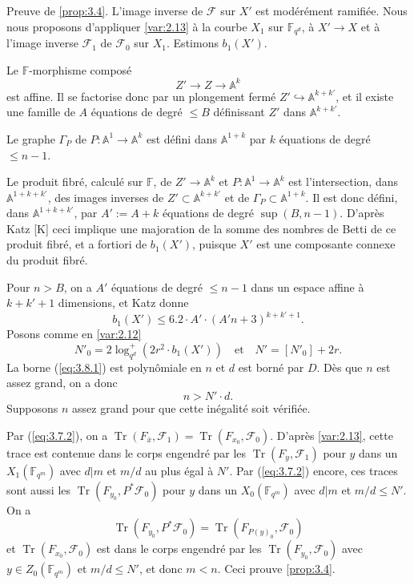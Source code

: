 \documentclass[11pt,a4paper]{article}
\theoremstyle{plain}
\theoremstyle{definition}
\DeclareMathOperator{\tr}{Tr}
\begin{document}
Preuve de \ref{prop:3.4}. L'image inverse de $\mathcal{F}$ sur $X'$ est mod\'er\'ement ramifi\'ee. Nous nous proposons d'appliquer \ref{var:2.13} \`a la courbe $X_1$ sur $\mathbb{F}_{q^d}$, \`a $X' \to X$ et \`a l'image inverse $\mathcal{F}_1$ de $\mathcal{F}_0$ sur $X_1$. Estimons $b_1(X')$.

Le $\mathbb{F}$-morphisme compos\'e
\[
Z' \to Z \to \mathbb{A}^k
\]
est affine. Il se factorise donc par un plongement ferm\'e $Z' \hookrightarrow \mathbb{A}^{k+k'}$, et il existe une famille de $A$ \'equations de degr\'e $\leq B$ d\'efinissant $Z'$ dans $\mathbb{A}^{k+k'}$.

Le graphe $\Gamma_P$ de $P: \mathbb{A}^1 \to \mathbb{A}^k$ est d\'efini dans $\mathbb{A}^{1+k}$ par $k$ \'equations de degr\'e $\leq n-1$.

Le produit fibr\'e, calcul\'e sur $\mathbb{F}$, de $Z' \to \mathbb{A}^k$ et $P: \mathbb{A}^1 \to \mathbb{A}^k$ est l'intersection, dans $\mathbb{A}^{1+k+k'}$, des images inverses de $Z' \subset \mathbb{A}^{k+k'}$ et de $\Gamma_P \subset \mathbb{A}^{1+k}$. Il est donc d\'efini, dans $\mathbb{A}^{1+k+k'}$, par $A' := A+k$ \'equations de degr\'e $\sup(B, n-1)$. D'apr\`es Katz [K] ceci implique une majoration de la somme des nombres de Betti de ce produit fibr\'e, et a fortiori de $b_1(X')$, puisque $X'$ est une composante connexe du produit fibr\'e.

Pour $n > B$, on a $A'$ \'equations de degr\'e $\leq n-1$ dans un espace affine \`a $k+k'+1$ dimensions, et Katz donne
\begin{equation}\label{eq:3.8.1}
b_1(X') \leq 6.2 \cdot A' \cdot (A'n+3)^{k+k'+1}.
\end{equation}
Posons comme en \ref{var:2.12}
\[
N'_0 = 2\log_{q^d}^+(2r^2 \cdot b_1(X')) \quad \text{et} \quad N' = [N'_0] + 2r.
\]
La borne (\ref{eq:3.8.1}) est polyn\^omiale en $n$ et $d$ est born\'e par $D$. D\`es que $n$ est assez grand, on a donc
\[
n > N' \cdot d.
\]
Supposons $n$ assez grand pour que cette in\'egalit\'e soit v\'erifi\'ee.

Par (\ref{eq:3.7.2}), on a $\tr(F_{\bar{x}}, \mathcal{F}_1) = \tr(F_{x_0}, \mathcal{F}_0)$. D'apr\`es \ref{var:2.13}, cette trace est contenue dans le corps engendr\'e par les $\tr(F_y, \mathcal{F}_1)$ pour $y$ dans un $X_1(\mathbb{F}_{q^m})$ avec $d|m$ et $m/d$ au plus \'egal \`a $N'$. Par (\ref{eq:3.7.2}) encore, ces traces sont aussi les $\tr(F_{y_0}, P^*\mathcal{F}_0)$ pour $y$ dans un $X_0(\mathbb{F}_{q^m})$ avec $d|m$ et $m/d \leq N'$. On a
\[
\tr(F_{y_0}, P^*\mathcal{F}_0) = \tr(F_{P(y)_0}, \mathcal{F}_0)
\]
et $\tr(F_{x_0}, \mathcal{F}_0)$ est dans le corps engendr\'e par les $\tr(F_{y_0}, \mathcal{F}_0)$ avec $y \in Z_0(\mathbb{F}_{q^m})$ et $m/d \leq N'$, et donc $m < n$. Ceci prouve \ref{prop:3.4}.
\end{document}
